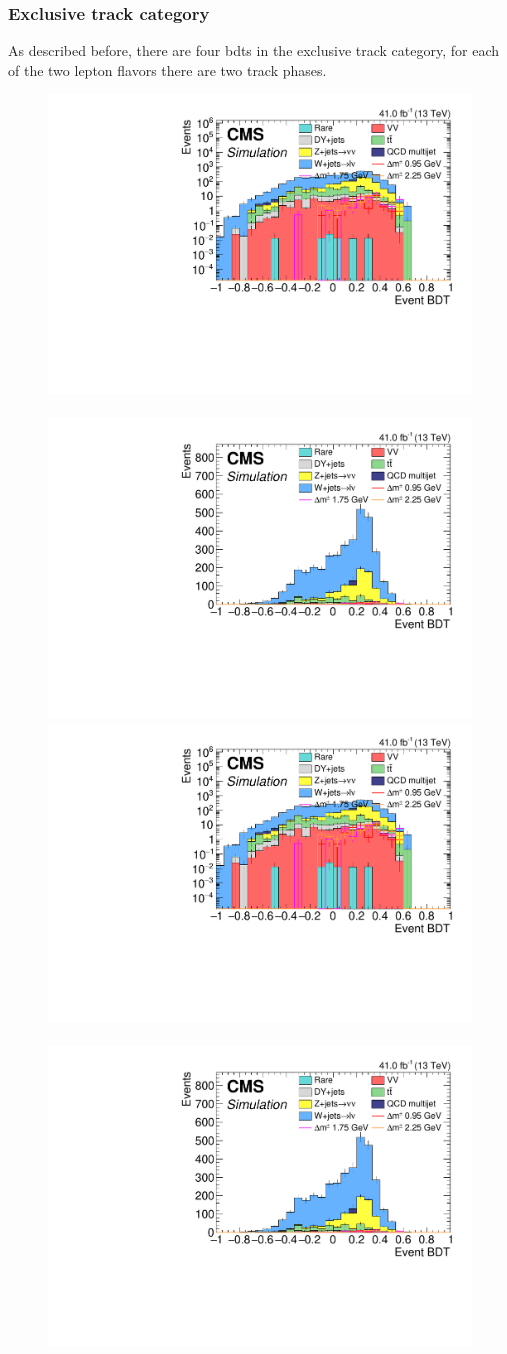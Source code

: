 
\clearpage
\subsubsection{Exclusive track category}

As described before, there are four \glspl{bdt} in the exclusive track category, for each of the two lepton flavors there are two track phases. 

\begin{figure}[!htb]
\centering
\includegraphics[width=0.48\linewidth]{plots/track_muon_bg_signal/none_exTrack_dilepBDTCorrJetNoMultIso10Dr0.6_log.pdf} \,
\includegraphics[width=0.48\linewidth]{plots/track_muon_bg_signal/none_exTrack_dilepBDTCorrJetNoMultIso10Dr0.6.pdf} \\

\includegraphics[width=0.48\linewidth]{plots/track_muon_bg_signal/none_exTrack_dilepBDTCorrJetNoMultIso10Dr0.6_log.pdf} \,
\includegraphics[width=0.48\linewidth]{plots/track_muon_bg_signal/none_exTrack_dilepBDTCorrJetNoMultIso10Dr0.6.pdf} \\


\end{figure}
